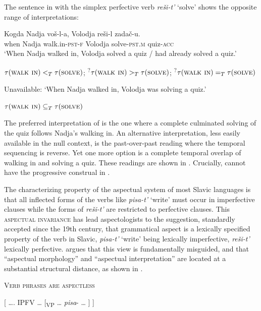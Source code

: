 \documentclass[output=paper,colorlinks,citecolor=brown]{langscibook}
\begin{document}
The sentence in  with the simplex perfective verb \textit{reši-t’} ‘solve’ shows the opposite range of interpretations: 

\ea\label{tat:ex:6}
\gll Kogda  Nadja  voš-l-a,  Volodja  reši-l  zadač-u.  \\
  when  Nadja  walk.in-\textsc{pst-f}  Volodja  solve-\textsc{pst.m}  quiz-\textsc{acc}\\
\ea   ‘When Nadja walked in, Volodja  solved a quiz  / had already solved a quiz.’

    $\tau(\textsc{walk in}) <_T \tau(\textsc{solve})$; \textsuperscript{?}$\tau(\textsc{walk in}) >_T \tau(\textsc{solve})$; \textsuperscript{?}$\tau(\textsc{walk in}) =_T \tau(\textsc{solve})$\label{ex:tatevosov:6a}

  \ex      Unavailable: ‘When Nadja walked in, Volodja was solving a quiz.’

    $\tau(\textsc{walk in}) \subseteq_T \tau(\textsc{solve})$\label{ex:tatevosov:6b}
\z
\z

\noindent The preferred interpretation of  is the one where a complete culminated solving of the quiz follows Nadja’s walking in. An alternative interpretation, less easily available in the null context, is the past-over-past reading where the temporal sequencing is reverse. Yet one more option is a complete temporal overlap of walking in and solving a quiz. These readings are shown in . Crucially,  cannot have the progressive construal in .

The characterizing property of the aspectual system of most Slavic languages is that all inflected forms of the verbs like \textit{pisa-t’} ‘write’ must occur in imperfective clauses while the forms of \textit{reši-t’} are restricted to perfective clauses. This \textsc{aspectual invariance} has lead aspectologists to the suggestion, standardly accepted since the 19th century, that grammatical aspect is a lexically specified property of the verb in Slavic, \textit{pisa-t’} ‘write’ being lexically imperfective, \textit{reši-t’} lexically perfective. \citet{Tatevosov2011,Tatevosov2015b,Tatevosov2021} argues that this view is fundamentally misguided, and that “aspectual morphology” and “aspectual interpretation” are located at a substantial structural distance, as shown in . 

\ea   \textsc{Verb phrases are aspectless}\label{tat:ex:7}

\ea{} [  …. IPFV …   [\textsubscript{VP} … \textit{pisa}- … ] ]\label{ex:tatevosov:7a}
\end{document}
